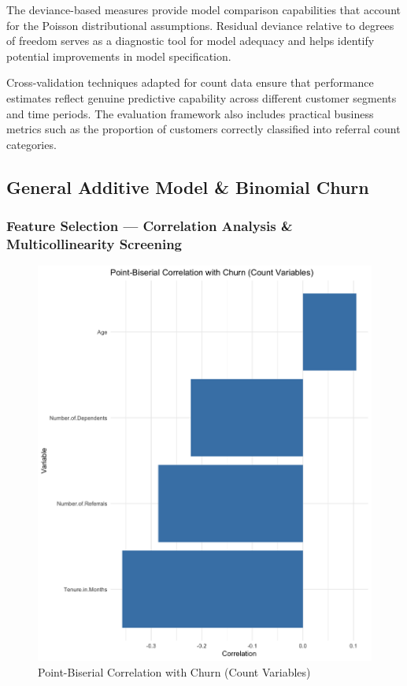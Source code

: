 \documentclass[
]{article}
\begin{document}
The deviance-based measures provide model comparison capabilities that
account for the Poisson distributional assumptions. Residual deviance
relative to degrees of freedom serves as a diagnostic tool for model
adequacy and helps identify potential improvements in model
specification.

Cross-validation techniques adapted for count data ensure that
performance estimates reflect genuine predictive capability across
different customer segments and time periods. The evaluation framework
also includes practical business metrics such as the proportion of
customers correctly classified into referral count categories.

\hypertarget{general-additive-model-binomial-churn}{%
\subsection{General Additive Model \& Binomial
Churn}\label{general-additive-model-binomial-churn}}

\hypertarget{feature-selection-correlation-analysis-multicollinearity-screening}{%
\subsubsection{Feature Selection --- Correlation Analysis \&
Multicollinearity
Screening}\label{feature-selection-correlation-analysis-multicollinearity-screening}}

\begin{figure}

{\centering \includegraphics[width=0.5\linewidth]{glm_gam_plots/count_correlation} 

}

\caption{Point-Biserial Correlation with Churn (Count Variables)}\label{fig:count-corr-img}
\end{figure}
\end{document}
